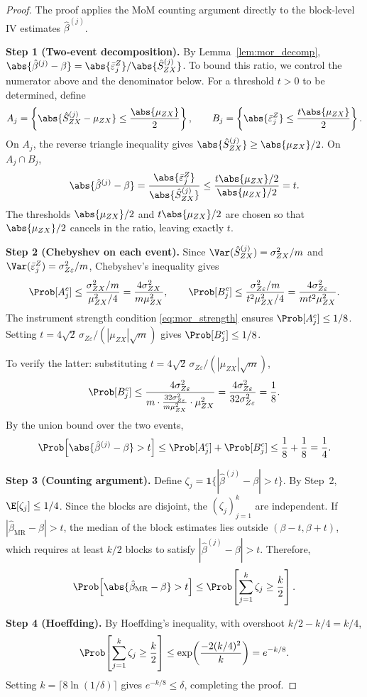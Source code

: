 \begin{proof}
The proof applies the MoM counting argument directly to the block-level IV estimates $\hat{\beta}^{(j)}$.

\medskip\noindent\textbf{Step 1 (Two-event decomposition).} By Lemma~\ref{lem:mor_decomp}, $\abs{\hat{\beta}^{(j)} - \beta} = \abs{\bar{\varepsilon}_j^Z}/\abs{\hat{S}_{ZX}^{(j)}}$. To bound this ratio, we control the numerator above and the denominator below. For a threshold $t > 0$ to be determined, define
\[
    A_j = \left\{\abs{\hat{S}_{ZX}^{(j)} - \mu_{ZX}} \leq \frac{\abs{\mu_{ZX}}}{2}\right\}, \qquad B_j = \left\{\abs{\bar{\varepsilon}_j^Z} \leq \frac{t\abs{\mu_{ZX}}}{2}\right\}.
\]
On $A_j$, the reverse triangle inequality gives $\abs{\hat{S}_{ZX}^{(j)}} \geq \abs{\mu_{ZX}}/2$. On $A_j \cap B_j$,
\[
    \abs{\hat{\beta}^{(j)} - \beta} = \frac{\abs{\bar{\varepsilon}_j^Z}}{\abs{\hat{S}_{ZX}^{(j)}}} \leq \frac{t\abs{\mu_{ZX}}/2}{\abs{\mu_{ZX}}/2} = t.
\]
The thresholds $\abs{\mu_{ZX}}/2$ and $t\abs{\mu_{ZX}}/2$ are chosen so that $\abs{\mu_{ZX}}/2$ cancels in the ratio, leaving exactly $t$.

\medskip\noindent\textbf{Step 2 (Chebyshev on each event).} Since $\Var(\hat{S}_{ZX}^{(j)}) = \sigma_{ZX}^2/m$ and $\Var(\bar{\varepsilon}_j^Z) = \sigma_{Z\varepsilon}^2/m$, Chebyshev's inequality gives
\[
    \Prob[A_j^c] \leq \frac{\sigma_{ZX}^2/m}{\mu_{ZX}^2/4} = \frac{4\sigma_{ZX}^2}{m\mu_{ZX}^2}, \qquad
    \Prob[B_j^c] \leq \frac{\sigma_{Z\varepsilon}^2/m}{t^2\mu_{ZX}^2/4} = \frac{4\sigma_{Z\varepsilon}^2}{mt^2\mu_{ZX}^2}.
\]
The instrument strength condition \eqref{eq:mor_strength} ensures $\Prob[A_j^c] \leq 1/8$. Setting $t = 4\sqrt{2}\,\sigma_{Z\varepsilon}/(|\mu_{ZX}|\sqrt{m})$ gives $\Prob[B_j^c] \leq 1/8$.

To verify the latter: substituting $t = 4\sqrt{2}\,\sigma_{Z\varepsilon}/(|\mu_{ZX}|\sqrt{m})$,
\[
    \Prob[B_j^c] \leq \frac{4\sigma_{Z\varepsilon}^2}{m \cdot \frac{32\sigma_{Z\varepsilon}^2}{m\mu_{ZX}^2} \cdot \mu_{ZX}^2} = \frac{4\sigma_{Z\varepsilon}^2}{32\sigma_{Z\varepsilon}^2} = \frac{1}{8}.
\]
By the union bound over the two events,
\[
    \Prob\!\left[\abs{\hat{\beta}^{(j)} - \beta} > t\right] \leq \Prob[A_j^c] + \Prob[B_j^c] \leq \frac{1}{8} + \frac{1}{8} = \frac{1}{4}.
\]

\medskip\noindent\textbf{Step 3 (Counting argument).} Define $\zeta_j = \mathbf{1}\{|\hat{\beta}^{(j)} - \beta| > t\}$. By Step~2, $\E[\zeta_j] \leq 1/4$. Since the blocks are disjoint, the $(\zeta_j)_{j=1}^{k}$ are independent. If $|\hat{\beta}_{\mathrm{MR}} - \beta| > t$, the median of the block estimates lies outside $(\beta - t, \beta + t)$, which requires at least $k/2$ blocks to satisfy $|\hat{\beta}^{(j)} - \beta| > t$. Therefore,
\[
    \Prob\!\left[\abs{\hat{\beta}_{\mathrm{MR}} - \beta} > t\right] \leq \Prob\!\left[\sum_{j=1}^{k}\zeta_j \geq \frac{k}{2}\right].
\]

\medskip\noindent\textbf{Step 4 (Hoeffding).} By Hoeffding's inequality, with overshoot $k/2 - k/4 = k/4$,
\[
    \Prob\!\left[\sum_{j=1}^{k}\zeta_j \geq \frac{k}{2}\right] \leq \exp\!\left(\frac{-2(k/4)^2}{k}\right) = e^{-k/8}.
\]
Setting $k = \lceil 8\ln(1/\delta)\rceil$ gives $e^{-k/8} \leq \delta$, completing the proof.
\end{proof}